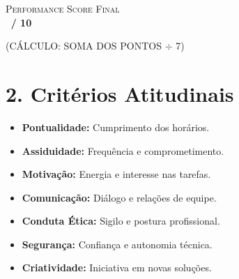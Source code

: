 \documentclass[a4paper,11pt]{article}
\begin{document}
\vspace{1.0cm}

\begin{center}
    \begin{tcolorbox}[
        enhanced, width=9cm, arc=0pt, boxrule=0.8pt, 
        colback=white, colframe=DeepNavy,
        shadow={2pt}{-2pt}{0pt}{SubtleGray}
    ]
        \centering
        {\scshape \small Performance Score Final} \\
        \vspace{0.3cm}
        {\Huge \textbf{\hrulefill \, / 10}}
        \par \vspace{0.2cm} \tiny \color{Graphite} (CÁLCULO: SOMA DOS PONTOS $\div$ 7)
    \end{tcolorbox}
\end{center}

\vspace{1.0cm}

\section{2. Critérios Atitudinais}

\vspace{0.4cm}
\begin{minipage}[t]{0.48\textwidth}
    \scriptsize {}
    \begin{itemize}[leftmargin=*, label=\color{DeepNavy}\tiny$\blacksquare$]
        \item \textbf{Pontualidade:} Cumprimento dos horários.
        \item \textbf{Assiduidade:} Frequência e comprometimento.
        \item \textbf{Motivação:} Energia e interesse nas tarefas.
        \item \textbf{Comunicação:} Diálogo e relações de equipe.
    \end{itemize}
\end{minipage}
\hfill
\begin{minipage}[t]{0.48\textwidth}
    \scriptsize {}
    \begin{itemize}[leftmargin=*, label=\color{DeepNavy}\tiny$\blacksquare$]
        \item \textbf{Conduta Ética:} Sigilo e postura profissional.
        \item \textbf{Segurança:} Confiança e autonomia técnica.
        \item \textbf{Criatividade:} Iniciativa em novas soluções.
    \end{itemize}
\end{minipage}
\end{document}
